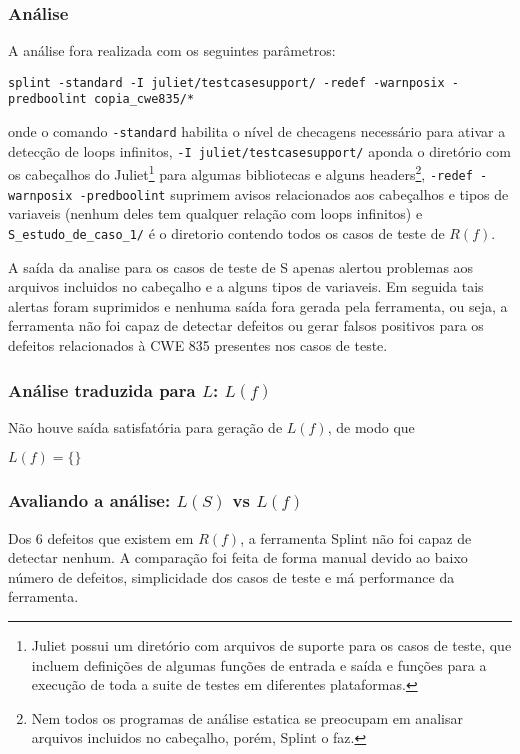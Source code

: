 \subsubsection{Análise}

A análise fora realizada com os seguintes parâmetros:

\lstinline{splint -standard -I juliet/testcasesupport/ -redef -warnposix -predboolint copia_cwe835/*}

onde o comando \lstinline{-standard} habilita o nível de checagens necessário para ativar a detecção de loops infinitos, \lstinline{-I juliet/testcasesupport/} aponda o diretório com os cabeçalhos do Juliet\footnote{Juliet possui um diretório com arquivos de suporte para os casos de teste, que incluem definições de algumas funções de entrada e saída e funções para a execução de toda a suite de testes em diferentes plataformas.} para algumas bibliotecas e alguns headers\footnote{Nem todos os programas de análise estatica se preocupam em analisar arquivos incluidos no cabeçalho, porém, Splint o faz.}, \lstinline{-redef -warnposix -predboolint} suprimem avisos relacionados aos cabeçalhos e tipos de variaveis (nenhum deles tem qualquer relação com loops infinitos) e \lstinline{S_estudo_de_caso_1/} é o diretorio contendo todos os casos de teste de $R(f)$.

A saída da analise para os casos de teste de S apenas alertou problemas aos arquivos incluidos no cabeçalho e a alguns tipos de variaveis. Em seguida tais alertas foram suprimidos e nenhuma saída fora gerada pela ferramenta, ou seja, a ferramenta não foi capaz de detectar defeitos ou gerar falsos positivos para os defeitos relacionados à CWE 835 presentes nos casos de teste.

\subsubsection{Análise traduzida para $L$: $L(f)$}

Não houve saída satisfatória para geração de $L(f)$, de modo que 

$L(f) = \lbrace\rbrace$

\subsubsection{Avaliando a análise: $L(S)$ vs $L(f)$}

Dos 6 defeitos que existem em $R(f)$, a ferramenta Splint não foi capaz de detectar nenhum. A comparação foi feita de forma manual devido ao baixo número de defeitos, simplicidade dos casos de teste e má performance da ferramenta.

